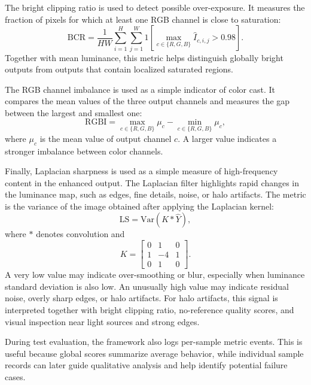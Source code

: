 The bright clipping ratio is used to detect possible over-exposure. It measures the fraction of pixels for which at least one RGB channel is close to saturation:
\begin{equation}
	\mathrm{BCR}
	=
	\frac{1}{HW}
	\sum_{i=1}^{H}
	\sum_{j=1}^{W}
	1
	\left[
	\max_{c \in \{R,G,B\}}
	\hat{I}_{c,i,j} > 0.98
	\right].
	\label{eq:bcr}
\end{equation}
Together with mean luminance, this metric helps distinguish globally bright outputs from outputs that contain localized saturated regions.

The RGB channel imbalance is used as a simple indicator of color cast. It compares the mean values of the three output channels and measures the gap between the largest and smallest one:
\begin{equation}
	\mathrm{RGBI}
	=
	\max_{c \in \{R,G,B\}} \mu_c
	-
	\min_{c \in \{R,G,B\}} \mu_c,
	\label{eq:rgbi}
\end{equation}
where $\mu_c$ is the mean value of output channel $c$. A larger value indicates a stronger imbalance between color channels.

Finally, Laplacian sharpness is used as a simple measure of high-frequency content in the enhanced output. The Laplacian filter highlights rapid changes in the luminance map, such as edges, fine details, noise, or halo artifacts. The metric is the variance of the image obtained after applying the Laplacian kernel:
\begin{equation}
	\mathrm{LS}
	=
	\mathrm{Var}(K * \hat{Y}),
	\label{eq:laplacian_sharpness}
\end{equation}
where $*$ denotes convolution and
\begin{equation}
	K =
	\begin{bmatrix}
		0 & 1 & 0 \\
		1 & -4 & 1 \\
		0 & 1 & 0
	\end{bmatrix}.
	\label{eq:laplacian_kernel}
\end{equation}
A very low value may indicate over-smoothing or blur, especially when luminance standard deviation is also low. An unusually high value may indicate residual noise, overly sharp edges, or halo artifacts. For halo artifacts, this signal is interpreted together with bright clipping ratio, no-reference quality scores, and visual inspection near light sources and strong edges.

During test evaluation, the framework also logs per-sample metric events. This is useful because global scores summarize average behavior, while individual sample records can later guide qualitative analysis and help identify potential failure cases.

